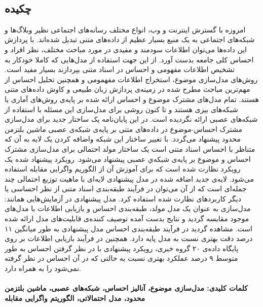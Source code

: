 
\setcounter{page}{1}
\thispagestyle{empty}

~\vfill

\subsection*{چکیده}
\begin{small}
\baselineskip=0.7cm
امروزه با گسترش اینترنت و وب، انواع مختلف رسانه‌های اجتماعی نظیر وبلاگ‌ها و شبکه‌های اجتماعی به یک منبع بسیار عظیم از داده‌‌های متنی تبدیل شده‌اند. با پردازش این داده‌ها می‌‌توان اطلاعات سودمند و مفیدی در مورد مباحث مختلف، نظر افراد و احساس کلی‌ جامعه بدست آورد. از این جهت استفاده از مدل‌هایی که کاملا خودکار به تشخیص اطلاعات مفهومی‌ و احساس در اسناد متنی بپردازند بسیار مفید است. روش‌های مدل‌سازی موضوع، استخراج اطلاعات مفهمومی و همچنین تحلیل احساس از مهم‌ترین مباحث مطرح شده در زمینه‌ی پردازش زبان طبیعی و کاوش داده‌های متنی هستند. تمام مدل‌های مشترک موضوع و احساس ارائه شده بر پایه‌ی روش‌های آماری یا شبکه‌های بیزی هستند و تا کنون روشی برای مدل‌سازی این مسئله با استفاده از شبکه‌های عصبی ارائه نگردیده است. در این پایان‌نامه یک ساختار جدید برای مدل‌سازی مشترک احساس-موضوع در داده‌های متنی بر پایه‌ی شبکه‌‌ی عصبی ماشین بلتزمن محدود پیشنهاد می‌‌گردد. با تغییر ساختار این شبکه واضافه کردن یک لایه به آن که متناظر با احساس اسناد متنی است یک ساختار مولد احتمالی برای مدل‌سازی مشترک احساس و موضوع بر پایه‌ی ‌شبکه‌ي عصبی پیشنهاد می‌‌شود. رویکرد پیشنهاد شده یک رویکرد نظارت شده است که برای آموزش آن از الگوریم واگرایی مقابله استفاده می‌‌شود. لایه‌ی جدید اضافه شده در مدل پیشنهادی لایه‌ای با ماهیت توزیع احتمالی‌ چند جمله‌ای است که از آن می‌‌توان در فرآیند طبقه‌بندی اسناد متنی از نظر احساسی‌ یا دیگر کاربرد‌های نظارت شده استفاده کرد. مدل پیشنهادی در آزمایش‌هایی همانند: مدل‌سازی به عنوان یک مدل مولد، طبقه‌بندی احساس و بازیابی اطلاعات با مدل‌های موجود مقایسه گردید و نتایج بدست آمده توصیف ‌کننده‌ی قابلیت‌های مدل ارائه شده است. مشاهده گردید در فرآیند طبقه‌بندی احساس مدل پیشنهادی به طور میانگین ۱۱ درصد دقت بهتری نسبت به مدل پایه دارد. همچنین در فرآیند بازیابی اطلاعات بر روی پایگاه داده‌ی ۲۰ گروه خبری، رویکرد پیشنهادی با در نظر گرفتن احساس به طور متوسط ۹ درصد عملکرد بهتری نسبت به حالتی که در آن احساس در نظر گرفته نمی‌‌شود را به همراه دارد.\\

\texttt{}
\\
\noindent\textbf{کلمات کلیدی: مدل‌سازی موضوع، آنالیز احساس، شبکه‌ها‌ی عصبی، ماشین بلتزمن محدود، مدل احتمالاتی، الگوریتم واگرایی مقابله}
\end{small} 